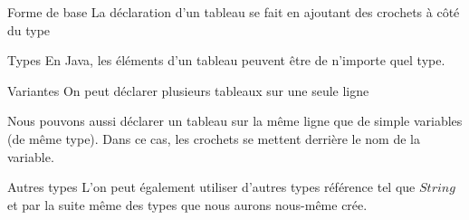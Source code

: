 \begin{frame}{Forme de base}
    La déclaration d'un tableau se fait en ajoutant des crochets à côté du type
    

    \begin{exampleblock}{Types}
        En Java, les éléments d'un tableau peuvent être de n'importe quel type.
    \end{exampleblock}

    

\end{frame}

\begin{frame}{Variantes}
    On peut déclarer plusieurs tableaux sur une seule ligne
    
    Nous pouvons aussi déclarer un tableau sur la même ligne que de simple variables (de même type).
    Dans ce cas, les crochets se mettent derrière le nom de la variable.
    
\end{frame}

\begin{frame}{Autres types}
    L'on peut également utiliser d'autres types référence tel que $String$ et par la suite même des types que nous aurons nous-même crée.

    
\end{frame}